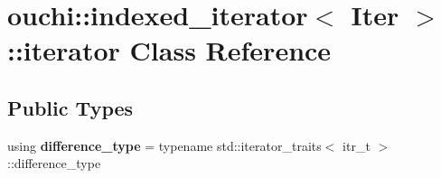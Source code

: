 \hypertarget{classouchi_1_1indexed__iterator_1_1iterator}{}\section{ouchi\+::indexed\+\_\+iterator$<$ Iter $>$\+::iterator Class Reference}
\label{classouchi_1_1indexed__iterator_1_1iterator}
\subsection*{Public Types}
\begin{DoxyCompactItemize}
\item 
\mbox{\label{classouchi_1_1indexed__iterator_1_1iterator_a9892f45d5b49e45bdeece2feca2adf73}} 
using {\bfseries difference\+\_\+type} = typename std\+::iterator\+\_\+traits$<$ itr\+\_\+t $>$\+::difference\+\_\+type
\end{DoxyCompactItemize}
